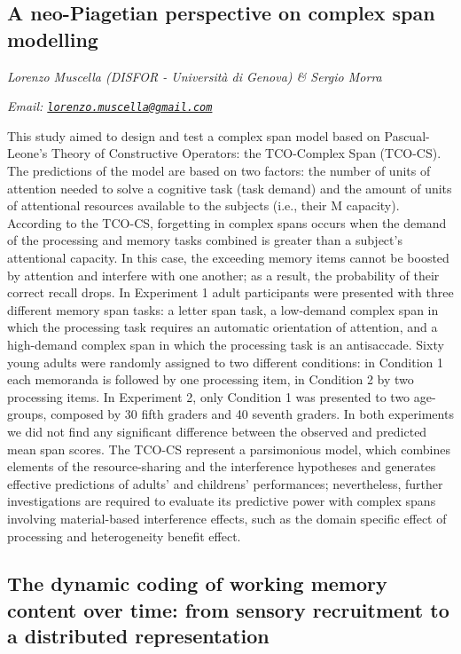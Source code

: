 \documentclass[12pt,]{book}
\begin{document}
\hypertarget{a-neo-piagetian-perspective-on-complex-span-modelling}{%
\subsection{A neo-Piagetian perspective on complex span modelling}\label{a-neo-piagetian-perspective-on-complex-span-modelling}}

\emph{Lorenzo Muscella (DISFOR - Università di Genova) \& Sergio Morra}

\emph{Email: \href{mailto:lorenzo.muscella@gmail.com}{\nolinkurl{lorenzo.muscella@gmail.com}}}

This study aimed to design and test a complex span model based on Pascual-Leone's Theory of Constructive Operators: the TCO-Complex Span (TCO-CS). The predictions of the model are based on two factors: the number of units of attention needed to solve a cognitive task (task demand) and the amount of units of attentional resources available to the subjects (i.e., their M capacity). According to the TCO-CS, forgetting in complex spans occurs when the demand of the processing and memory tasks combined is greater than a subject's attentional capacity. In this case, the exceeding memory items cannot be boosted by attention and interfere with one another; as a result, the probability of their correct recall drops. In Experiment 1 adult participants were presented with three different memory span tasks: a letter span task, a low-demand complex span in which the processing task requires an automatic orientation of attention, and a high-demand complex span in which the processing task is an antisaccade. Sixty young adults were randomly assigned to two different conditions: in Condition 1 each memoranda is followed by one processing item, in Condition 2 by two processing items. In Experiment 2, only Condition 1 was presented to two age-groups, composed by 30 fifth graders and 40 seventh graders. In both experiments we did not find any significant difference between the observed and predicted mean span scores. The TCO-CS represent a parsimonious model, which combines elements of the resource-sharing and the interference hypotheses and generates effective predictions of adults' and childrens' performances; nevertheless, further investigations are required to evaluate its predictive power with complex spans involving material-based interference effects, such as the domain specific effect of processing and heterogeneity benefit effect.

\hypertarget{the-dynamic-coding-of-working-memory-content-over-time-from-sensory-recruitment-to-a-distributed-representation}{%
\subsection{The dynamic coding of working memory content over time: from sensory recruitment to a distributed representation}\label{the-dynamic-coding-of-working-memory-content-over-time-from-sensory-recruitment-to-a-distributed-representation}}
\end{document}
